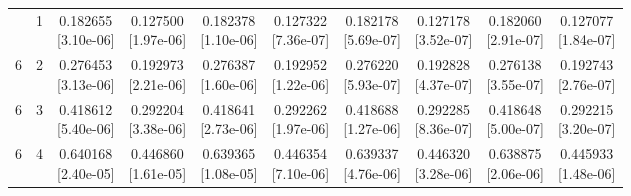 \documentclass[12pt,letterpaper]{article}
\theoremstyle{plain}
\theoremstyle{definition}
\begin{document}
\begin{table}[p]
\begin{adjustbox}{max width=\linewidth}
\begin{tabular}{@{}rr*{8}{c}@{}}
\addlinespace[2pt]
6 & 1 & \shortstack{0.182655\\[-1pt]{\scriptsize[3.10e-06]}} & \shortstack{0.127500\\[-1pt]{\scriptsize[1.97e-06]}} & \shortstack{0.182378\\[-1pt]{\scriptsize[1.10e-06]}} & \shortstack{0.127322\\[-1pt]{\scriptsize[7.36e-07]}} & \shortstack{0.182178\\[-1pt]{\scriptsize[5.69e-07]}} & \shortstack{0.127178\\[-1pt]{\scriptsize[3.52e-07]}} & \shortstack{0.182060\\[-1pt]{\scriptsize[2.91e-07]}} & \shortstack{0.127077\\[-1pt]{\scriptsize[1.84e-07]}}\\
6 & 2 & \shortstack{0.276453\\[-1pt]{\scriptsize[3.13e-06]}} & \shortstack{0.192973\\[-1pt]{\scriptsize[2.21e-06]}} & \shortstack{0.276387\\[-1pt]{\scriptsize[1.60e-06]}} & \shortstack{0.192952\\[-1pt]{\scriptsize[1.22e-06]}} & \shortstack{0.276220\\[-1pt]{\scriptsize[5.93e-07]}} & \shortstack{0.192828\\[-1pt]{\scriptsize[4.37e-07]}} & \shortstack{0.276138\\[-1pt]{\scriptsize[3.55e-07]}} & \shortstack{0.192743\\[-1pt]{\scriptsize[2.76e-07]}}\\
6 & 3 & \shortstack{0.418612\\[-1pt]{\scriptsize[5.40e-06]}} & \shortstack{0.292204\\[-1pt]{\scriptsize[3.38e-06]}} & \shortstack{0.418641\\[-1pt]{\scriptsize[2.73e-06]}} & \shortstack{0.292262\\[-1pt]{\scriptsize[1.97e-06]}} & \shortstack{0.418688\\[-1pt]{\scriptsize[1.27e-06]}} & \shortstack{0.292285\\[-1pt]{\scriptsize[8.36e-07]}} & \shortstack{0.418648\\[-1pt]{\scriptsize[5.00e-07]}} & \shortstack{0.292215\\[-1pt]{\scriptsize[3.20e-07]}}\\
6 & 4 & \shortstack{0.640168\\[-1pt]{\scriptsize[2.40e-05]}} & \shortstack{0.446860\\[-1pt]{\scriptsize[1.61e-05]}} & \shortstack{0.639365\\[-1pt]{\scriptsize[1.08e-05]}} & \shortstack{0.446354\\[-1pt]{\scriptsize[7.10e-06]}} & \shortstack{0.639337\\[-1pt]{\scriptsize[4.76e-06]}} & \shortstack{0.446320\\[-1pt]{\scriptsize[3.28e-06]}} & \shortstack{0.638875\\[-1pt]{\scriptsize[2.06e-06]}} & \shortstack{0.445933\\[-1pt]{\scriptsize[1.48e-06]}}\\

\end{tabular}
\end{adjustbox}
\end{table}
\end{document}
